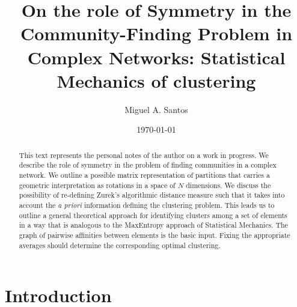 \documentclass[twocolumn,aps,sort,nofootinbib]{revtex4}
\begin{document}
\title{On the role of Symmetry in the Community-Finding Problem in
Complex Networks: Statistical Mechanics of clustering}
\author{Miguel A. Santos}
\begin{abstract}
This text represents the personal notes of the author on
a work in progress.
We describe the role of symmetry in the problem of finding communities in
a complex network. We outline a possible matrix representation of
partitions that carries a geometric interpretation as rotations in a
space of $N$ dimensions.
We discuss the possibility of re-defining 
Zurek's algorithmic distance measure such that
it takes into account the {\em a priori} information
defining the clustering problem.
This leads us to outline a general theoretical approach 
for identifying clusters among 
a set of elements in a way that is analogous to the MaxEntropy approach of 
Statistical Mechanics. The graph of pairwise affinities %
between elements is the basic input. Fixing the
appropriate averages should determine the corresponding optimal clustering.
\end{abstract}


\date{\today}
\maketitle
\tableofcontents

\section{Introduction}
\end{document}

